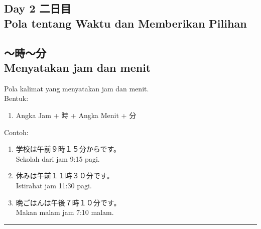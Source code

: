 \begin{flushright}
    \section*{\Large{Day 2 二日目 \\
    Pola tentang Waktu dan Memberikan Pilihan}}
\end{flushright}

\subsection*{
    ～時～分 \\ 
    Menyatakan jam dan menit
}
Pola kalimat yang menyatakan jam dan menit.\\
Bentuk:
\begin{enumerate}
    \item Angka Jam + 時 + Angka Menit + 分
\end{enumerate}
Contoh: 
\begin{enumerate}
    \item 学校は午前９時１５分からです。
    \\ Sekolah dari jam 9:15 pagi.
    \item 休みは午前１１時３０分です。
    \\ Istirahat jam 11:30 pagi.
    \item 晩ごはんは午後７時１０分です。
    \\ Makan malam jam 7:10 malam.
\end{enumerate}

\vspace{0.2cm}\hrule height 1pt\vspace{0.2cm}


